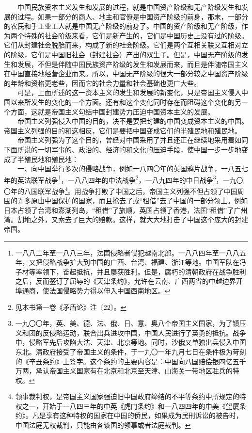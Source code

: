 \documentclass[cn,11pt,chinese]{elegantbook}
\begin{document}
　　中国民族资本主义发生和发展的过程，就是中国资产阶级和无产阶级发生和发展的过程。如果一部分的商人、地主和官僚是中国资产阶级的前身，那末，一部分的农民和手工业工人就是中国无产阶级的前身了。中国的资产阶级和无产阶级，作为两个特殊的社会阶级来看，它们是新产生的，它们是中国历史上没有过的阶级。它们从封建社会脱胎而来，构成了新的社会阶级。它们是两个互相关联又互相对立的阶级，它们是中国旧社会（封建社会）产出的双生子。但是，中国无产阶级的发生和发展，不但是伴随中国民族资产阶级的发生和发展而来，而且是伴随帝国主义在中国直接地经营企业而来。所以，中国无产阶级的很大一部分较之中国资产阶级的年龄和资格更老些，因而它的社会力量和社会基础也更广大些。\\
　　可是，上面所述的这一资本主义的发生和发展的新变化，只是帝国主义侵入中国以来所发生的变化的一个方面。还有和这个变化同时存在而阻碍这个变化的另一个方面，这就是帝国主义勾结中国封建势力压迫中国资本主义的发展。\\
　　帝国主义列强侵入中国的目的，决不是要把封建的中国变成资本主义的中国。帝国主义列强的目的和这相反，它们是要把中国变成它们的半殖民地和殖民地。\\
　　帝国主义列强为了这个目的，曾经对中国采用了并且还正在继续地采用着如同下面所说的一切军事的、政治的、经济的和文化的压迫手段，使中国一步一步地变成了半殖民地和殖民地：\\
　　一、向中国举行多次的侵略战争，例如一八四〇年的英国鸦片战争，一八五七年的英法联军战争\footnote[18]{ 一八八二年至一八八三年，法国侵略者侵犯越南北部。一八八四年至一八八五年，又把侵略战争扩大到中国的广西、台湾、福建、浙江等地。中国军队在冯子材等率领下，奋起抵抗，并且屡获胜利。但是，腐朽的清朝政府在战争胜利之后，反而签订了屈辱的《天津条约》，允许在云南、广西两省的中越边界开埠通商，使法国侵略势力得以伸入中国西南地区。}，一八八四年的中法战争\footnote[19]{ 见本书第一卷《矛盾论》注〔22〕。}，一八九四年的中日战争\footnote[20]{ 一九〇〇年，英、美、德、法、俄、日、意、奥八个帝国主义国家，为了镇压义和团的反侵略运动，联合出兵进攻中国，中国人民进行了英勇的抵抗。战争中，侵略军先后攻陷大沽、天津、北京等地。同时，沙俄又单独出兵侵入中国东北。清政府接受了帝国主义的条件，于一九〇一年九月七日在条件极为苛刻的《辛丑条约》上签字。这个条约的主要内容是：中国向八国赔偿银四亿五千万两，承认帝国主义国家有在北京和北京至天津、山海关一带地区驻兵的特权。}，一九〇〇年的八国联军战争\footnote[21]{ 领事裁判权，是帝国主义国家强迫旧中国政府缔结的不平等条约中所规定的特权之一，开始于一八四三年的中英《虎门条约》和一八四四年的中美《望厦条约》。凡是享有这种特权的国家在中国的侨民，如果成为民刑诉讼的被告时，中国法庭无权裁判，只能由各该国的领事或者法庭裁判。}。用战争打败了中国之后，帝国主义列强不但占领了中国周围的许多原由中国保护的国家，而且抢去了或“租借”去了中国的一部分领土。例如日本占领了台湾和澎湖列岛，“租借”了旅顺，英国占领了香港，法国“租借”了广州湾。割地之外，又索去了巨大的赔款。这样，就大大地打击了中国这个庞大的封建帝国。\\
\end{document}
